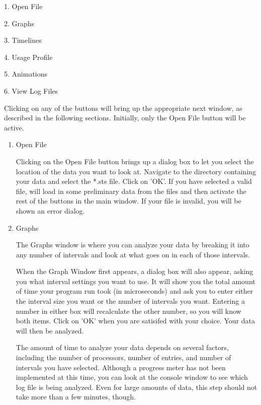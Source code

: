 1. Open File

2. Graphs

3. Timelines

4. Usage Profile

5. Animations

6. View Log Files

Clicking on any of the buttons will bring up the appropriate next window, as
described in the following sections.  Initially, only the Open File button
will be active.
\begin{enumerate}
\item
Open File

   Clicking on the Open File button brings up a dialog box to let you select
   the location of the data you want to look at.  Navigate to the directory
   containing your data and select the *.sts file.  Click on 'OK'.  If you
   have selected a valid file, \projections{} will load in some preliminary data
   from the files and then activate the rest of the buttons in the main window.
   If your file is invalid, you will be shown an error dialog.

\item
Graphs

   The Graphs window is where you can analyze your data by breaking it into
   any number of intervals and look at what goes on in each of those intervals.

   When the Graph Window first appears, a dialog box will also appear, asking
   you what interval settings you want to use.  It will show you the total
   amount of time your program run took (in microseconds) and ask you to enter
   either the interval size you want or the number of intervals you want.
   Entering a number in either box will recalculate the other number, so you
   will know both items. Click on 'OK' when you are satisifed with your choice.
   Your data will then be analyzed.

   The amount of time to analyze your data depends on several factors, including
   the number of processors, number of entries, and number of intervals you have
   selected.  Although a progress meter has not been implemented at this time,
   you can look at the console window to see which log file is being analyzed.
   Even for large amounts of data, this step should not take more than a few
   minutes, though.


\end{enumerate}
